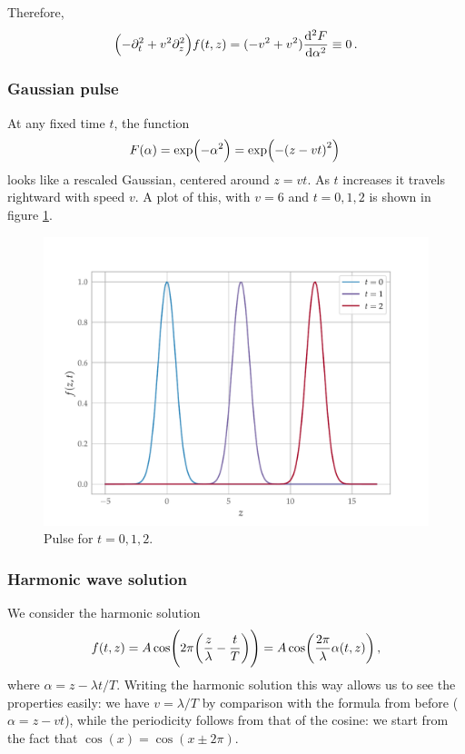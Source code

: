 \documentclass[main.tex]{subfiles}
\begin{document}
Therefore, 
%
\begin{align}
\qty(-\partial_{t}^2 + v^2 \partial_{z}^2) f(t, z) 
= (-v^2 + v^2) \dv[2]{F}{\alpha } \equiv 0 
\,.
\end{align}

\subsubsection{Gaussian pulse}

At any fixed time \(t\), the function 
%
\begin{align}
F(\alpha ) = \exp(- \alpha^2) = \exp(- \qty(z - v t)^2)
\,
\end{align}
%
looks like a rescaled Gaussian, centered around \(z = vt\). As \(t\) increases it travels rightward with speed \(v\). A plot of this, with \(v = 6\) and \(t = 0, 1, 2\) is shown in figure \ref{fig:moving-gaussian-pulse}.

\begin{figure}[H]
\centering
\includegraphics[width=\textwidth]{figures/gauss.pdf}
\caption{Pulse for \(t = 0, 1, 2\).}
\label{fig:moving-gaussian-pulse}
\end{figure}

\subsubsection{Harmonic wave solution}

We consider the harmonic solution 
%
\begin{align}
f(t,z) 
= A \cos(2 \pi \qty(\frac{z}{\lambda } - \frac{t}{T})) 
= A \cos(\frac{2\pi}{\lambda } \alpha (t,z)) 
\,,
\end{align}
%
where \(\alpha  = z - \lambda t /T\). Writing the harmonic solution this way allows us to see the properties easily: we have \(v  = \lambda / T\) by comparison with the formula from before (\(\alpha = z - vt\)), while the periodicity follows from that of the cosine: we start from the fact that \(\cos(x) = \cos(x \pm 2 \pi )\).
\end{document}
